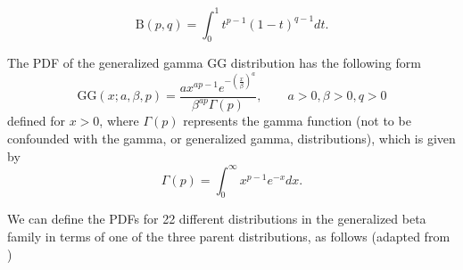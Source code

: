 \documentclass{article}
\begin{document}
\begin{equation}
\text{B}(p, q) = \int_0^1 t^{p-1} (1 - t)^{q-1} dt.
\end{equation}

The PDF of the generalized gamma GG distribution has the following form
\begin{equation}
\text{GG}(x; a, \beta, p) = \frac{ax^{ap-1}e^{-\left(\frac{x}{\beta}\right)^a}}{\beta^{ap}\Gamma(p)}, \qquad a > 0, \beta > 0, q > 0
\end{equation}
defined for $x > 0$, where $\Gamma(p)$ represents the gamma function (not to be confounded with the gamma, or generalized gamma, distributions), which is given by
\begin{equation}
\Gamma(p) = \int_0^\infty x^{p-1}e^{-x} dx.
\end{equation}

We can define the PDFs for 22 different distributions in the generalized beta family in terms of one of the three parent distributions, as follows (adapted from \citealp{ducey2015sizebiased})
\end{document}
